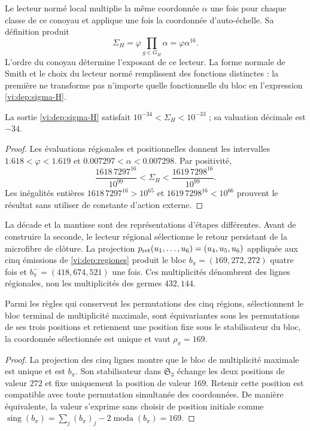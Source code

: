 Le lecteur normé local multiplie la même coordonnée \(\alpha\)
une fois pour chaque classe de ce conoyau et applique une fois la coordonnée
d’auto-échelle. Sa définition produit
\begin{equation}
 \Sigma_H=\varphi\prod_{g\in G_H}\alpha
         =\varphi\alpha^{16}.
 \label{vi:dep:sigma-H}
\end{equation}
L’ordre du conoyau détermine l’exposant de ce lecteur. La forme
normale de Smith et le choix du lecteur normé remplissent des fonctions
distinctes : la première ne transforme pas n’importe quelle fonctionnelle du bloc en
l’expression \eqref{vi:dep:sigma-H}.

\begin{proposition}
\label{vi:dep:decada}
La sortie \eqref{vi:dep:sigma-H} satisfait
\(10^{-34}<\Sigma_H<10^{-33}\) ; sa valuation décimale est \(-34\).
\end{proposition}
\begin{proof}
Les évaluations régionales et positionnelles donnent les intervalles
\(1.618<\varphi<1.619\) et \(0.007297<\alpha<0.007298\).
Par positivité,
\[
 \frac{1618\,7297^{16}}{10^{99}}
 <\Sigma_H<
 \frac{1619\,7298^{16}}{10^{99}}.
\]
Les inégalités entières
\(1618\,7297^{16}>10^{65}\) et
\(1619\,7298^{16}<10^{66}\) prouvent le résultat sans utiliser de
constante d’action externe.
\end{proof}

La décade et la mantisse sont des représentations d’étapes différentes.
Avant de construire la seconde, le lecteur régional sélectionne le retour
persistant de la microfibre de clôture. La projection
\(p_{\rm ret}(u_1,\ldots,u_6)=(u_4,u_5,u_6)\) appliquée aux
cinq émissions de \ref{vi:dep:regiones} produit le bloc
\(b_\pi=(169,272,272)\) quatre fois et
\(b_\pi^-=(418,674,521)\) une fois. Ces multiplicités dénombrent des
lignes régionales, non les multiplicités des germes \(432,144\).

\begin{proposition}
\label{vi:dep:selector169}
Parmi les règles qui conservent les permutations des cinq régions,
sélectionnent le bloc terminal de multiplicité maximale, sont équivariantes
sous les permutations de ses trois positions et retiennent une position fixe
sous le stabilisateur du bloc, la coordonnée sélectionnée est unique
et vaut \(\rho_\pi=169\).
\end{proposition}
\begin{proof}
La projection des cinq lignes montre que le bloc de multiplicité
maximale est unique et est \(b_\pi\). Son stabilisateur dans
\(\mathfrak S_3\) échange les deux positions de valeur \(272\)
et fixe uniquement la position de valeur \(169\). Retenir cette position
est compatible avec toute permutation simultanée des coordonnées.
De manière équivalente, la valeur s’exprime sans choisir de position initiale
comme
\(\operatorname{sing}(b_\pi)=\sum_j(b_\pi)_j
-2\operatorname{moda}(b_\pi)=169\).
\end{proof}

